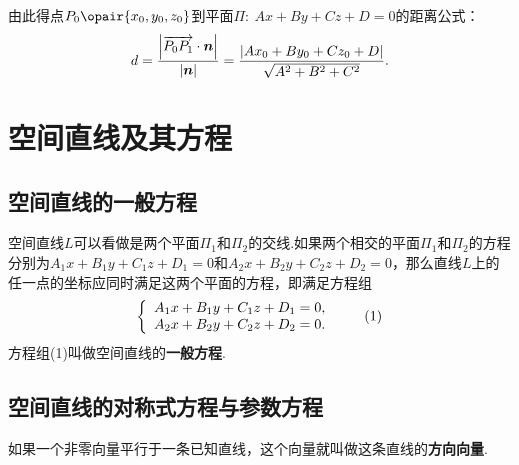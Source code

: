 由此得点\(P_0\opair{x_0,y_0,z_0}\)到平面\(\Pi:\: Ax+By+Cz+D=0\)的距离公式：\[
d = \frac{\abs{\overrightarrow{P_0 P_1} \cdot \boldsymbol{n}}}{\abs{\boldsymbol{n}}} = \frac{\abs{A x_0 + B y_0 + C z_0 + D}}{\sqrt{A^2+B^2+C^2}}.
\]

\section{空间直线及其方程}
\subsection{空间直线的一般方程}
空间直线\(L\)可以看做是两个平面\(\Pi_1\)和\(\Pi_2\)的交线.如果两个相交的平面\(\Pi_1\)和\(\Pi_2\)的方程分别为\(A_1x+B_1y+C_1z+D_1=0\)和\(A_2x+B_2y+C_2z+D_2=0\)，那么直线\(L\)上的任一点的坐标应同时满足这两个平面的方程，即满足方程组\begin{gather}
\left\{ \begin{array}{l}
A_1x+B_1y+C_1z+D_1=0, \\
A_2x+B_2y+C_2z+D_2=0.
\end{array} \right. \tag1
\end{gather}
方程组(1)叫做空间直线的\textbf{一般方程}.

\subsection{空间直线的对称式方程与参数方程}
\begin{definition}
如果一个非零向量平行于一条已知直线，这个向量就叫做这条直线的\textbf{方向向量}.
\end{definition}

